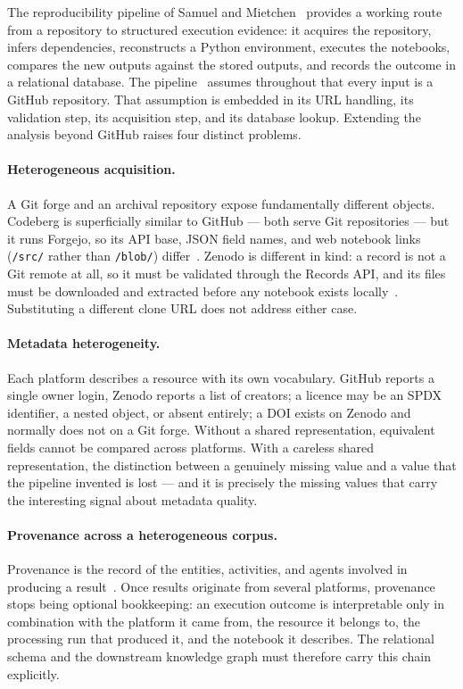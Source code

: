 The reproducibility pipeline of Samuel and Mietchen~\cite{samuel2024computational} provides a working route from a repository to structured execution evidence: it acquires the repository, infers dependencies, reconstructs a Python environment, executes the notebooks, compares the new outputs against the stored outputs, and records the outcome in a relational database. The pipeline~\cite{samuel2024computational} assumes throughout that every input is a GitHub repository. That assumption is embedded in its URL handling, its validation step, its acquisition step, and its database lookup. Extending the analysis beyond GitHub raises four distinct problems.

\paragraph{Heterogeneous acquisition.} A Git forge and an archival repository expose fundamentally different objects. Codeberg is superficially similar to GitHub --- both serve Git repositories --- but it runs Forgejo, so its API base, JSON field names, and web notebook links (\texttt{/src/} rather than \texttt{/blob/}) differ~\cite{forgejoapi}. Zenodo is different in kind: a record is not a Git remote at all, so it must be validated through the Records API, and its files must be downloaded and extracted before any notebook exists locally~\cite{zenodoapi}. Substituting a different clone URL does not address either case.

\paragraph{Metadata heterogeneity.} Each platform describes a resource with its own vocabulary. GitHub reports a single owner login, Zenodo reports a list of creators; a licence may be an SPDX identifier, a nested object, or absent entirely; a DOI exists on Zenodo and normally does not on a Git forge. Without a shared representation, equivalent fields cannot be compared across platforms. With a careless shared representation, the distinction between a genuinely missing value and a value that the pipeline invented is lost --- and it is precisely the missing values that carry the interesting signal about metadata quality.

\paragraph{Provenance across a heterogeneous corpus.} Provenance is the record of the entities, activities, and agents involved in producing a result~\cite{prov2013}. Once results originate from several platforms, provenance stops being optional bookkeeping: an execution outcome is interpretable only in combination with the platform it came from, the resource it belongs to, the processing run that produced it, and the notebook it describes. The relational schema and the downstream knowledge graph must therefore carry this chain explicitly.

